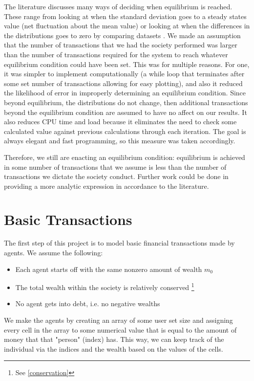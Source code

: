 \documentclass[11pt]{article}
\begin{document}
	The literature discusses many ways of deciding when equilibrium is reached. These range from looking at when the standard deviation goes to a steady states value (net fluctuation about the mean value) \cite{patriarca} or looking at when the differences in the distributions goes to zero by comparing datasets \cite{goswami}. We made an assumption that the number of transactions that we had the society performed was larger than the number of transactions required for the system to reach whatever equilibrium condition could have been set. This was for multiple reasons. For one, it was simpler to implement computationally (a while loop that terminates after some set number of transactions allowing for easy plotting), and also it reduced the likelihood of error in improperly determining an equilibrium condition. Since beyond equilibrium, the distributions do not change, then additional transactions beyond the equilibrium condition are assumed to have no affect on our results. It also reduces CPU time and load because it eliminates the need to check some calculated value against previous calculations through each iteration. The goal is always elegant and fast programming, so this measure was taken accordingly. 
	
	Therefore, we still are enacting an equilibrium condition: equilibrium is achieved in some number of transactions that we assume is less than the number of transactions we dictate the society conduct. Further work could be done in providing a more analytic expression in accordance to the literature.
	
	\section{Basic Transactions} \label{basic}
	
	The first step of this project is to model basic financial transactions made by agents. We assume the following:
	\begin{itemize}
		\item Each agent starts off with the same nonzero amount of wealth $m_{0}$
		\item The total wealth within the society is relatively conserved \footnote{See \ref{conservation}}
		\item No agent gets into debt, i.e. no negative wealths
	\end{itemize}
	
	We make the agents by creating an array of some user set size and assigning every cell in the array to some numerical value that is equal to the amount of money that that "person" (index) has. This way, we can keep track of the individual via the indices and the wealth based on the values of the cells.
	
\end{document}
